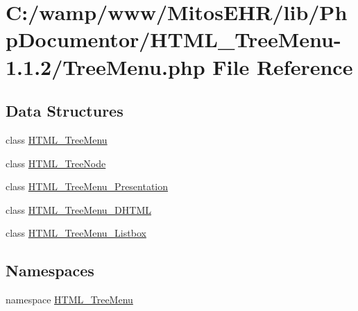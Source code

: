 \hypertarget{_tree_menu_8php}{\section{\-C\-:/wamp/www/\-Mitos\-E\-H\-R/lib/\-Php\-Documentor/\-H\-T\-M\-L\-\_\-\-Tree\-Menu-\/1.1.2/\-Tree\-Menu.php \-File \-Reference}
\label{_tree_menu_8php}
}
\subsection*{\-Data \-Structures}
\begin{DoxyCompactItemize}
\item 
class \hyperlink{class_h_t_m_l___tree_menu}{\-H\-T\-M\-L\-\_\-\-Tree\-Menu}
\item 
class \hyperlink{class_h_t_m_l___tree_node}{\-H\-T\-M\-L\-\_\-\-Tree\-Node}
\item 
class \hyperlink{class_h_t_m_l___tree_menu___presentation}{\-H\-T\-M\-L\-\_\-\-Tree\-Menu\-\_\-\-Presentation}
\item 
class \hyperlink{class_h_t_m_l___tree_menu___d_h_t_m_l}{\-H\-T\-M\-L\-\_\-\-Tree\-Menu\-\_\-\-D\-H\-T\-M\-L}
\item 
class \hyperlink{class_h_t_m_l___tree_menu___listbox}{\-H\-T\-M\-L\-\_\-\-Tree\-Menu\-\_\-\-Listbox}
\end{DoxyCompactItemize}
\subsection*{\-Namespaces}
\begin{DoxyCompactItemize}
\item 
namespace \hyperlink{namespace_h_t_m_l___tree_menu}{\-H\-T\-M\-L\-\_\-\-Tree\-Menu}
\end{DoxyCompactItemize}
